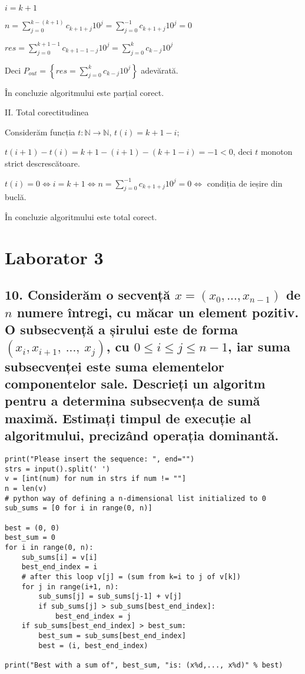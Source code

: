 \documentclass[11pt]{article}
\begin{document}
$i = k + 1$

$n = \sum\limits_{j=0}^{k-(k+1)}c_{k+1+j}10^{j}
= \sum\limits_{j=0}^{-1}c_{k+1+j}10^{j} = 0$

$\mathit{res} = \sum\limits_{j=0}^{k+1-1}c_{k+1-1-j}10^{j}
= \sum\limits_{j=0}^{k}c_{k-j}10^{j}$

Deci $P_{out} = \left\{ \mathit{res} = \sum\limits_{j=0}^{k} c_{k-j}10^{j} \right\} $ adevărată.

În concluzie algoritmului este parțial corect.

\vspace{14pt}
\noindent
II. Total corectitudinea
\newline

Considerăm funcția $t: \mathbb{N} \to \mathbb{N}$, $t(i) = k + 1 - i$;

$t(i + 1) - t(i) = k + 1 - (i + 1) - (k + 1 - i) = -1 < 0$, deci $t$ monoton strict descrescătoare.

$t(i) = 0 \iff i = k + 1 \iff n = \sum\limits_{j=0}^{-1}c_{k+1+j}10^{j} = 0\iff$ condiția de ieșire din buclă.

În concluzie algoritmului este total corect.

\pagebreak

\section*{Laborator 3}
\label{sec:org60040c6}
\subsection*{10. Considerăm o secvență \(x = (x_{0},..., x_{n-1})\) de \(n\) numere întregi, cu măcar un element pozitiv. O subsecvență a șirului este de forma \((x_{i}, x_{i+1},\ ...,\ x_{j})\), cu \(0 \le i \le j \le n - 1\), iar suma subsecvenței este suma elementelor componentelor sale. Descrieți un algoritm pentru a determina subsecvența de sumă maximă. Estimați timpul de execuție al algoritmului, precizând operația dominantă.}
\label{sec:org1f33276}

\begin{verbatim}
print("Please insert the sequence: ", end="")
strs = input().split(' ')
v = [int(num) for num in strs if num != ""]
n = len(v)
# python way of defining a n-dimensional list initialized to 0
sub_sums = [0 for i in range(0, n)]

best = (0, 0)
best_sum = 0
for i in range(0, n):
    sub_sums[i] = v[i]
    best_end_index = i
    # after this loop v[j] = (sum from k=i to j of v[k])
    for j in range(i+1, n):
        sub_sums[j] = sub_sums[j-1] + v[j]
        if sub_sums[j] > sub_sums[best_end_index]:
            best_end_index = j
    if sub_sums[best_end_index] > best_sum:
        best_sum = sub_sums[best_end_index]
        best = (i, best_end_index)

print("Best with a sum of", best_sum, "is: (x%d,..., x%d)" % best)
\end{verbatim}
\end{document}
